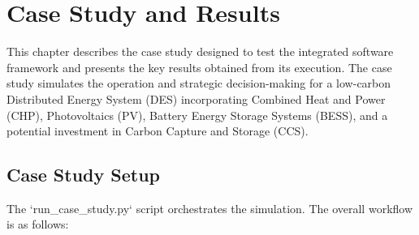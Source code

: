 \chapter{Case Study and Results}
\label{chap:results}

This chapter describes the case study designed to test the integrated software framework and presents the key results obtained from its execution. The case study simulates the operation and strategic decision-making for a low-carbon Distributed Energy System (DES) incorporating Combined Heat and Power (CHP), Photovoltaics (PV), Battery Energy Storage Systems (BESS), and a potential investment in Carbon Capture and Storage (CCS).

\section{Case Study Setup}
The `run_case_study.py` script orchestrates the simulation. The overall workflow is as follows:

